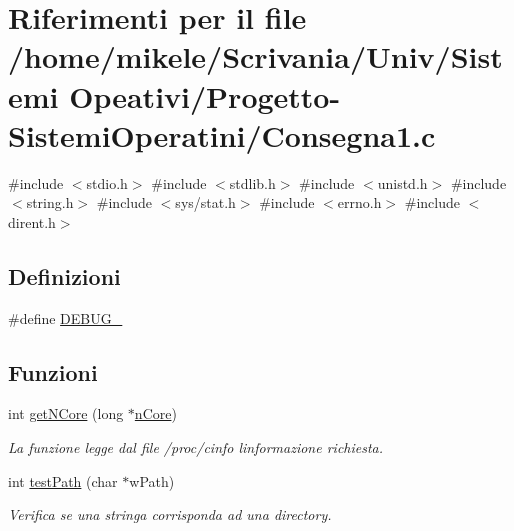 \hypertarget{a00008}{}\section{Riferimenti per il file /home/mikele/\+Scrivania/\+Univ/\+Sistemi Opeativi/\+Progetto-\/\+Sistemi\+Operatini/\+Consegna1.c}
\label{a00008}
{\ttfamily \#include $<$stdio.\+h$>$}\newline
{\ttfamily \#include $<$stdlib.\+h$>$}\newline
{\ttfamily \#include $<$unistd.\+h$>$}\newline
{\ttfamily \#include $<$string.\+h$>$}\newline
{\ttfamily \#include $<$sys/stat.\+h$>$}\newline
{\ttfamily \#include $<$errno.\+h$>$}\newline
{\ttfamily \#include $<$dirent.\+h$>$}\newline
\subsection*{Definizioni}
\begin{DoxyCompactItemize}
\item 
\#define \mbox{\hyperlink{a00008_aedac27103da1d7cbeb79d62837ce00d1}{D\+E\+B\+U\+G\+\_\+}}
\end{DoxyCompactItemize}
\subsection*{Funzioni}
\begin{DoxyCompactItemize}
\item 
int \mbox{\hyperlink{a00008_a45da120f57baa2bfd2da67be556dfa8a}{get\+N\+Core}} (long $\ast$\mbox{\hyperlink{a00008_aa458de5166b611b8c2c9c8e7a4a87d87}{n\+Core}})
\begin{DoxyCompactList}\small\item\em La funzione legge dal file /proc/cinfo l\textquotesingle{}informazione richiesta. \end{DoxyCompactList}\item 
int \mbox{\hyperlink{a00008_ad53b7ea4b153982d90a2c13cc2712980}{test\+Path}} (char $\ast$w\+Path)
\begin{DoxyCompactList}\small\item\em Verifica se una stringa corrisponda ad una directory. \end{DoxyCompactList}\end{DoxyCompactItemize}
